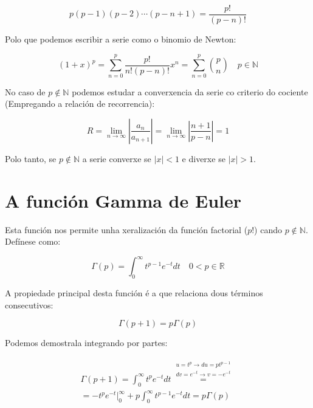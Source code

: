 \documentclass[a4paper,12pt,titlepage]{article}
\begin{document}
\begin{equation*}
    p(p-1)(p-2)\cdots (p-n+1) = \frac{p!}{(p-n)!}
\end{equation*}

Polo que podemos escribir a serie como o binomio de Newton:

\begin{equation*}
    (1+x)^p = \sum_{n=0}^p \frac{p!}{n!(p-n)!}x^n = \sum_{n=0}^p \binom{p}{n} \quad p\in \mathbb{N}
\end{equation*}

No caso de $p\notin \mathbb{N}$ podemos estudar a converxencia da serie co criterio do cociente (Empregando a relación de recorrencia):

\begin{equation*}
    R=\lim_{n\to \infty}\left |\frac{a_n}{a_{n+1}}\right | = \lim_{n\to \infty} \left |\frac{n+1}{p-n}\right | = 1
\end{equation*}

Polo tanto, se $p\notin \mathbb{N}$ a serie converxe se $|x|<1$ e diverxe se $|x|>1$.

\newpage

\section{A función Gamma de Euler}

Esta función nos permite unha xeralización da función factorial ($p!$) cando $p\notin \mathbb{N}$. Defínese como:

\begin{equation*}
    \Gamma(p) = \int_{0}^{\infty} t^{p-1}e^{-t}dt \quad 0<p\in \mathbb{R}
\end{equation*}

A propiedade principal desta función é a que relaciona dous términos consecutivos:

\begin{equation*}
    \Gamma(p+1) = p\Gamma(p)
\end{equation*}

Podemos demostrala integrando por partes:

\begin{equation*}
    \begin{gathered}
        \Gamma(p+1) = \int_0^{\infty} t^pe^{-t}dt \overset{\begin{array}{l}
            u=t^p \rightarrow du=pt^{p-1}\\
            dv=e^{-t} \rightarrow v = -e^{-t} \end{array}}{=} \\ =-t^pe^{-t}\Big|_0^{\infty} + p\int_{0}^{\infty} t^{p-1}e^{-t}dt = p\Gamma(p)
    \end{gathered}
\end{equation*}
\end{document}
